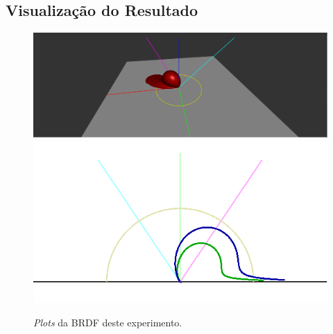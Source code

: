 \subsection{Visualização do Resultado}
\begin{figure}[H]
    \caption{\small{\textit{Plots} da BRDF deste experimento.}}\label{fig-cook-torrance-alternative-plots}
    \vspace{42px}
  \includegraphics[width=\linewidth]{./Imagens/brdfs/cook-torrance-alternative-3D-plot}
\endminipage\hfill
{}
  \includegraphics[width=\linewidth]{./Imagens/brdfs/cook-torrance-alternative-polar-plot-log.png}
\endminipage\hfill
\end{figure}

